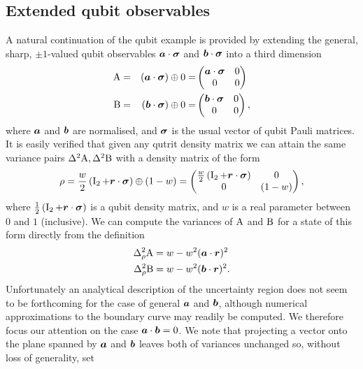 \subsection{Extended qubit observables}
\label{sec:qubit-extended-uncertainty}
A natural continuation of the qubit example is provided by extending the general, sharp, $\pm 1$-valued qubit observables $\bm{a}\cdot{\boldsymbol\sigma}$ and $\bm{b}\cdot{\boldsymbol\sigma}$ into a third dimension
\begin{alignat}{3}
  \label{eqn:extended-qubit-obs-defn}
  \operatorname{A} &= &(\bm{a}\cdot{\boldsymbol\sigma}) \oplus 0 = &\begin{pmatrix}\bm{a}\cdot{\boldsymbol\sigma} & 0\\ 0 &0\\\end{pmatrix}\\
  \operatorname{B} &= &(\bm{b}\cdot{\boldsymbol\sigma}) \oplus 0 = &\begin{pmatrix}\bm{b}\cdot{\boldsymbol\sigma} & 0\\ 0 &0\\\end{pmatrix},
\end{alignat}
where $\bm{a}$ and $\bm{b}$ are normalised, and ${\boldsymbol\sigma}$ is the usual vector of qubit Pauli matrices. It is easily verified that given any qutrit density matrix we can attain the same variance pairs $\var{\opa}, \var{\opb}$ with a density matrix of the form
\begin{align}
  \rho =\frac{w}{2}\left(\operatorname{I}_2 + \bm{r}\cdot{\boldsymbol\sigma}\right) \oplus (1-w)=\begin{pmatrix}\frac{w}{2}\left(\operatorname{I}_2 + \bm{r}\cdot{\boldsymbol\sigma}\right) & 0 \\ 0& (1-w)\end{pmatrix},
\end{align}
where $\frac{1}{2}\left(\operatorname{I}_2 + \bm{r}\cdot{\boldsymbol\sigma}\right)$ is a qubit density matrix, and $w$ is a real parameter between $0$ and $1$ (inclusive). We can compute the variances of $\operatorname{A}$ and $\operatorname{B}$ for a state of this form directly from the definition
\begin{align}
  \varr{\opa} &= w - w^2 (\boa\cdot\bor)^2\\
  \varr{\opb} &= w - w^2 (\bob\cdot\bor)^2.
\end{align}
Unfortunately an analytical description of the uncertainty region does not seem to be forthcoming for the case of general $\bm{a}$ and $\bm{b}$, although numerical approximations to the boundary curve may readily be computed. We therefore focus our attention on the case $\bm{a}\cdot\bm{b} = 0$. We note that projecting a vector onto the plane spanned by $\bm{a}$ and $\bm{b}$ leaves both of variances unchanged so, without loss of generality, set 
